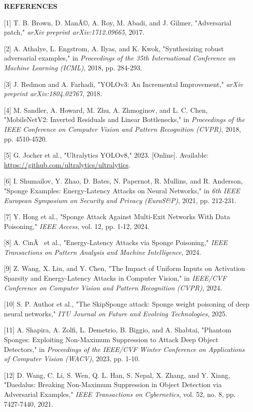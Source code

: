 \documentclass[]{article}
\begin{document}
\textbf{\hfill\break
REFERENCES}

{[}1{]} T. B. Brown, D. ManÃ©, A. Roy, M. Abadi, and J. Gilmer, "Adversarial patch," \emph{arXiv preprint arXiv:1712.09665}, 2017.

{[}2{]} A. Athalye, L. Engstrom, A. Ilyas, and K. Kwok, "Synthesizing robust adversarial examples," in \emph{Proceedings of the 35th International Conference on Machine Learning (ICML)}, 2018, pp. 284-293.

{[}3{]} J. Redmon and A. Farhadi, "YOLOv3: An Incremental Improvement," \emph{arXiv preprint arXiv:1804.02767}, 2018.

{[}4{]} M. Sandler, A. Howard, M. Zhu, A. Zhmoginov, and L. C. Chen, "MobileNetV2: Inverted Residuals and Linear Bottlenecks," in \emph{Proceedings of the IEEE Conference on Computer Vision and Pattern Recognition (CVPR)}, 2018, pp. 4510-4520.

{[}5{]} G. Jocher et al., "Ultralytics YOLOv8," 2023. {[}Online{]}. Available: \url{https://github.com/ultralytics/ultralytics}.

{[}6{]} I. Shumailov, Y. Zhao, D. Bates, N. Papernot, R. Mullins, and R. Anderson, "Sponge Examples: Energy-Latency Attacks on Neural Networks," in \emph{6th IEEE European Symposium on Security and Privacy (EuroS\&P)}, 2021, pp. 212-231.

{[}7{]} Y. Hong et al., "Sponge Attack Against Multi-Exit Networks With Data Poisoning," \emph{IEEE Access}, vol. 12, pp. 1-12, 2024.

{[}8{]} A. CinÃ  et al., "Energy-Latency Attacks via Sponge Poisoning," \emph{IEEE Transactions on Pattern Analysis and Machine Intelligence}, 2024.

{[}9{]} Z. Wang, X. Liu, and Y. Chen, "The Impact of Uniform Inputs on Activation Sparsity and Energy-Latency Attacks in Computer Vision," in \emph{IEEE/CVF Conference on Computer Vision and Pattern Recognition (CVPR)}, 2024.

{[}10{]} S. P. Author et al., "The SkipSponge attack: Sponge weight poisoning of deep neural networks," \emph{ITU Journal on Future and Evolving Technologies}, 2025.

{[}11{]} A. Shapira, A. Zolfi, L. Demetrio, B. Biggio, and A. Shabtai, "Phantom Sponges: Exploiting Non-Maximum Suppression to Attack Deep Object Detectors," in \emph{Proceedings of the IEEE/CVF Winter Conference on Applications of Computer Vision (WACV)}, 2023, pp. 1-10.

{[}12{]} D. Wang, C. Li, S. Wen, Q. L. Han, S. Nepal, X. Zhang, and Y. Xiang, "Daedalus: Breaking Non-Maximum Suppression in Object Detection via Adversarial Examples," \emph{IEEE Transactions on Cybernetics}, vol. 52, no. 8, pp. 7427-7440, 2021.
\end{document}
